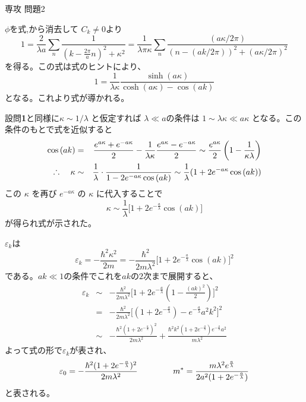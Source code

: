 \documentclass[fleqn]{jbook}
\begin{document}
\begin{answer}{専攻 問題2}{}
\begin{subanswers}
\begin{subsubanswers}
  \SubSubAnswer
    $\phi$を式,から消去して $C_k \neq 0$より
%
    \[ 1 = \frac{2}{\lambda a}\sum_n%
           \frac{1}{(k-\frac{2\pi}{a}n)^2+\kappa^2}%
         = \frac{1}{\lambda\pi\kappa} \sum_n%
           \frac{(a\kappa/2\pi)}{(n-(ak/2\pi))^2+(a\kappa/2\pi)^2} \]
%
    を得る。この式は式のヒントにより、
%
    \[ 1 = \frac{1}{\lambda\kappa}%
           \frac{\sinh{(a\kappa)}}{\cosh{(a\kappa)}-\cos{(ak)}} \]
%
    となる。これより式が導かれる。

  \SubSubAnswer
    設問{\bf 1}と同様に$\kappa \sim 1/\lambda$ と仮定すれば
    $\lambda \ll a$の条件は $1\sim \lambda\kappa \ll a\kappa$
    となる。この条件のもとで式を近似すると
%
    \begin{eqnarray*}
      \cos{(ak)} &=&  \frac{e^{a\kappa}+e^{-a\kappa}}{2}%
                     -\frac{1}{\lambda\kappa}%
                      \frac{e^{a\kappa}-e^{-a\kappa}}{2}%
                \sim  \frac{e^{a\kappa}}{2}%
                      \left(1-\frac{1}{\kappa\lambda}\right) \\
    \Yueni \;%
      \kappa &\sim& \frac{1}{\lambda}\cdot%
                    \frac{1}{1-2e^{-a\kappa}\cos{(ak)}}%
              \sim  \frac{1}{\lambda}(1+2e^{-a\kappa}\cos{(ak)})
    \end{eqnarray*} 
%
    この $\kappa$ を再び $e^{-a\kappa}$ の $\kappa$ に代入することで
%
    \[ \kappa \sim \frac{1}{\lambda}%
                   \bigl[1+2e^{-\frac{a}{\lambda}}\cos{(ak)}\bigr] \]
%
    が得られ式が示された。


  \SubSubAnswer
    $\varepsilon_k$は
%
    \[ \varepsilon_k%
        = -\frac{\hbar^2\kappa^2}{2m}%
        = -\frac{\hbar^2}{2m\lambda^2}%
           \bigl[1+2e^{-\frac{a}{\lambda}}\cos{(ak)}\bigr]^2 \]
%
    である。$ak\ll 1$の条件でこれを$ak$の$2$次まで展開すると、
%
    \begin{eqnarray*}
      \varepsilon_k%
        &\sim& -\frac{\hbar^2}{2m\lambda^2}\bigl[%
                1+2e^{-\frac{a}{\lambda}}(1-\frac{(ak)^2}{2})%
               \bigr]^2 \\
        &=&    -\frac{\hbar^2}{2m\lambda^2}\bigl[%
                 (1+2e^{-\frac{a}{\lambda}})%
                 - e^{-\frac{a}{\lambda}}a^2k^2%
               \bigr]^2 \\
        &\sim& -\frac{\hbar^2(1+2e^{-\frac{a}{\lambda}})^2}%
                {2m\lambda^2}%
               +\frac{\hbar^2k^2(1+2e^{-\frac{a}{\lambda}})e^{-\frac{a}{\lambda}}a^2}{m\lambda^2}
    \end{eqnarray*}
%
    よって式の形で$\varepsilon_k$が表され、
%
    \[ \varepsilon_0%
       = -\frac{\hbar^2 (1+2e^{-\frac{a}{\lambda}})^2}{2m\lambda^2}
       \hspace{15mm}
       m^\ast%
       = \frac{m\lambda^2 e^{\frac{a}{\lambda}}}%
              {2a^2(1+2e^{-\frac{a}{\lambda}})} \]
%
    と表される。


\end{subsubanswers}
\end{subanswers}
\end{answer}
\end{document}
